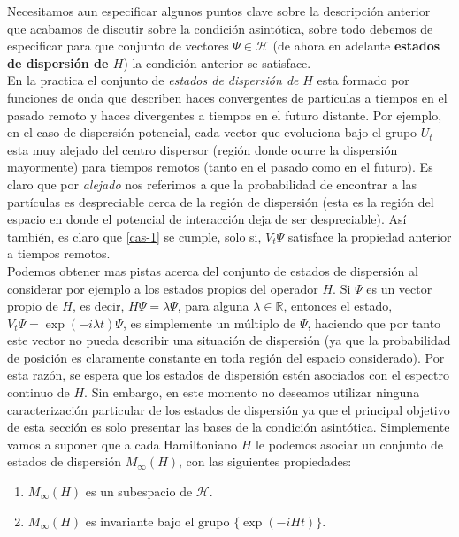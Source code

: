 \documentclass[12pt]{book}
\numberwithin{equation}{chapter}
\def\n{\noindent}
\def\R{\mathbb{R}}
\def\H{\mathcal{H}}
\begin{document}
Necesitamos aun especificar algunos puntos clave sobre la descripci\'on anterior que acabamos de discutir sobre la condici\'on asint\'otica, sobre todo debemos de especificar para que conjunto de vectores $\Psi \in \H$ (de ahora en adelante {\bf estados de dispersi\'on de $H$}) la condici\'on anterior se satisface.\\

\n En la practica el conjunto de \emph{estados de dispersi\'on de} $H$ esta formado por funciones de onda que describen haces convergentes de part\'iculas a tiempos en el pasado remoto y haces divergentes a tiempos en el futuro distante. Por ejemplo, en el caso de dispersi\'on potencial, cada vector que evoluciona bajo el grupo $U_{t}$ esta muy alejado del centro dispersor (regi\'on donde ocurre la dispersi\'on mayormente) para tiempos remotos (tanto en el pasado como en el futuro). Es claro que por \emph{alejado} nos referimos a que la probabilidad de encontrar a las part\'iculas es despreciable cerca de la regi\'on de dispersi\'on (esta es la regi\'on del espacio en donde el potencial de interacci\'on deja de ser despreciable). As\'i tambi\'en, es claro que \eqref{cas-1} se cumple, solo si, $V_{t} \Psi$ satisface la propiedad anterior a tiempos remotos.\\

Podemos obtener mas pistas acerca del conjunto de estados de dispersi\'on al considerar por ejemplo a los estados propios del operador $H$. Si $\Psi$ es un vector propio de $H$, es decir, $ H \Psi = \lambda \Psi $, para alguna $\lambda \in \R$, entonces el estado, $ V_{t}\Psi= \exp( -i \lambda t )\Psi $, es simplemente un m\'ultiplo de $\Psi$, haciendo que por tanto este vector no pueda describir una situaci\'on de dispersi\'on (ya que la probabilidad de posici\'on es claramente constante en toda regi\'on del espacio considerado). Por esta raz\'on, se espera que los estados de dispersi\'on est\'en asociados con el espectro  continuo de $H$. Sin embargo, en este momento no deseamos utilizar ninguna caracterizaci\'on particular de los estados de dispersi\'on ya que el principal objetivo de esta secci\'on es solo presentar las bases de la condici\'on asint\'otica. Simplemente vamos a suponer que a cada Hamiltoniano $H$ le podemos asociar un conjunto de estados de dispersi\'on $M_{\infty}(H)$, con las siguientes propiedades:
\begin{enumerate}
\item $M_{\infty}(H)$ es un subespacio de $\H$.
\item $M_{\infty}(H)$ es invariante bajo el grupo $\{ \exp( -iHt ) \}$.
\end{enumerate}
\end{document}

